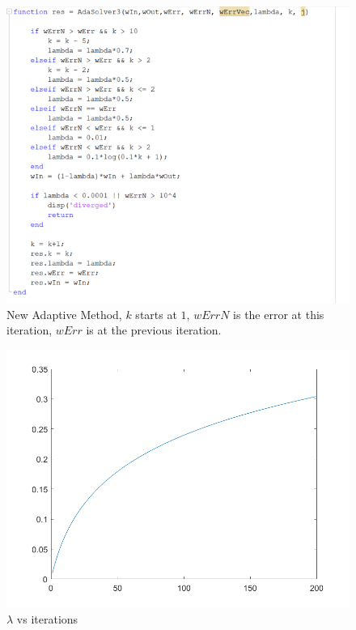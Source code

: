 \documentclass[11pt, a4paper]{article}
\theoremstyle{definition}
\begin{document}
\begin{figure}[h]
	\centering
	\includegraphics[scale=0.8]{Screen1.png}
	\caption{New Adaptive Method, $k$ starts at $1$, $wErrN$ is the error at this iteration, $wErr$ is at the previous iteration.} 
	\label{F1}
\end{figure}
\begin{figure}[h]
	\centering
	\includegraphics[scale=0.4]{Plot1.png}
	\caption{$\lambda$ vs iterations} 
	\label{F2}
\end{figure}
\end{document}
